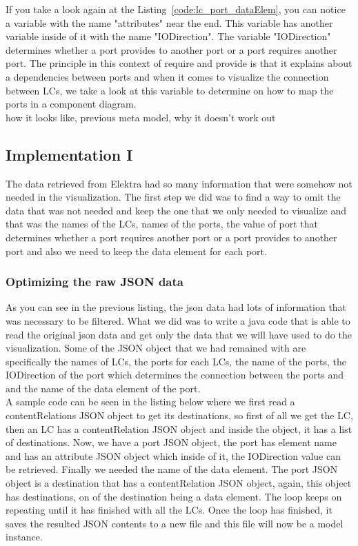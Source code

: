 If you take a look again at the Listing~\ref{code:lc_port_dataElem}, you can notice a variable with the name "attributes" near the end. This variable has another variable inside of it with the name "IODirection". The variable "IODirection" determines whether a port provides to another port or a port requires another port. The principle in this context of require and provide is that it explains about a dependencies between ports and when it comes to visualize the connection between LCs, we take a look at this variable to determine on how to map the ports in a component diagram.\\

how it looks like, previous meta model, why it doesn't work out \todo{[to be filled in]}


\subsection{Implementation I}
The data retrieved from Elektra had so many information that were somehow not needed in the visualization. The first step we did was to find a way to omit the data that was not needed and keep the one that we only needed to visualize and that was the names of the LCs, names of the ports, the value of port that determines whether a port requires another port or a port provides to another port and also we need to keep the data element for each port.

\subsubsection{Optimizing the raw JSON data}
As you can see in the previous listing, the json data had lots of information that was necessary to be filtered. What we did was to write a java code that is able to read the original json data and get only the data that we will have used to do the visualization. Some of the JSON object that we had remained with are specifically the names of LCs, the ports for each LCs, the name of the ports, the IODirection of the port which determines the connection between the ports and and the name of the data element of the port.\\

A sample code can be seen in the listing below where we first read a contentRelations JSON object to get its destinations, so first of all we get the LC, then an LC has a contentRelation JSON object and inside the object, it has a list of destinations. Now, we have a port JSON object, the port has element name and has an attribute JSON object which inside of it, the IODirection value can be retrieved. Finally we needed the name of the data element. The port JSON object is a destination that has a contentRelation JSON object, again, this object has destinations, on of the destination being a data element. The loop keeps on repeating until it has finished with all the LCs. Once the loop has finished, it saves the resulted JSON contents to a new file and this file will now be a model instance. \\

